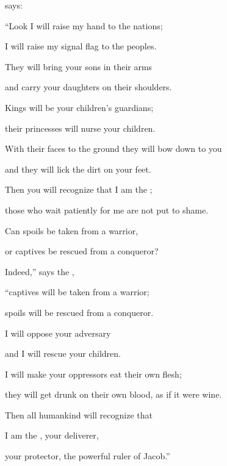 {{}
says:
\par }{\Q “Look
I will raise
my hand
to
the nations;
\par }{\Q I will raise
my signal flag
to
the peoples.
\par }{\Q They will bring
your sons
in their arms
\par }{\Q and carry
your daughters
on
their shoulders.
\par }{\Q {}Kings
will be
your children’s guardians;
\par }{\Q their princesses
will nurse
your children.

\par }{\Q With their faces
to the ground
they will bow down
to you
\par }{\Q and they will lick
the dirt
on your feet.
\par }{\Q Then you will recognize
that
I
am the
{};
\par }{\Q those who wait
patiently for me are not
put to shame.
\par }{\Q {}Can spoils
be taken
from a warrior,
\par }{\Q or
captives
be rescued
from a conqueror?
\par }{\Q {}Indeed,”
says
the {},
\par }{\Q “captives
will be taken
from a warrior;
\par }{\Q spoils
will be rescued
from
a conqueror.
\par }{\Q I
will oppose
your adversary
\par }{\Q and I
will rescue
your children.
\par }{\Q {}I will make your oppressors
eat
their own flesh;
\par }{\Q they will get drunk
on their own blood,
as if it were wine.
\par }{\Q Then all
humankind
will recognize
that
\par }{\Q I am
the {}, your deliverer,
\par }{\Q your protector,
the powerful ruler
of Jacob.”

\par }
